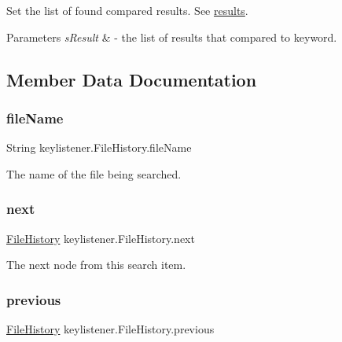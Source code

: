 Set the list of found compared results. See \hyperlink{classkeylistener_1_1_file_history_a665862b474b78805e841aaf23ab1123c}{results}. 
\begin{DoxyParams}{Parameters}
{\em s\+Result} & -\/ the list of results that compared to keyword. \\
\hline
\end{DoxyParams}


\subsection{Member Data Documentation}
\mbox{\label{classkeylistener_1_1_file_history_aa039d04ae73d6098a0d63f42dcf7a953}} 
\subsubsection{\texorpdfstring{file\+Name}{fileName}}
{\footnotesize\ttfamily String keylistener.\+File\+History.\+file\+Name\hspace{0.3cm}{\ttfamily [private]}}

The name of the file being searched. \mbox{\label{classkeylistener_1_1_file_history_aa9571ba3eabdcc6b9e7d152a0a7537ee}} 
\subsubsection{\texorpdfstring{next}{next}}
{\footnotesize\ttfamily \hyperlink{classkeylistener_1_1_file_history}{File\+History} keylistener.\+File\+History.\+next\hspace{0.3cm}{\ttfamily [private]}}

The next node from this search item. \mbox{\label{classkeylistener_1_1_file_history_ab08fec8e2a293a9000087d18e1454c44}} 
\subsubsection{\texorpdfstring{previous}{previous}}
{\footnotesize\ttfamily \hyperlink{classkeylistener_1_1_file_history}{File\+History} keylistener.\+File\+History.\+previous\hspace{0.3cm}{\ttfamily [private]}}

